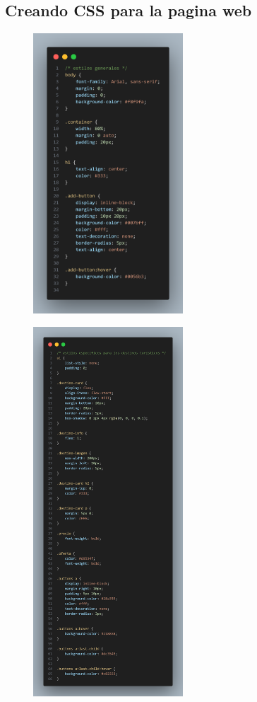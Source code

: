 \documentclass{article}
\begin{document}
	\subsection{Creando CSS para la pagina web}
	\begin{figure}[H]
		\centering
		\includegraphics[width=0.5\textwidth,keepaspectratio]{img/styles1.png}
	\end{figure}
	\begin{figure}[H]
		\centering
		\includegraphics[width=0.5\textwidth,keepaspectratio]{img/styles2.png}
	\end{figure}
\end{document}
